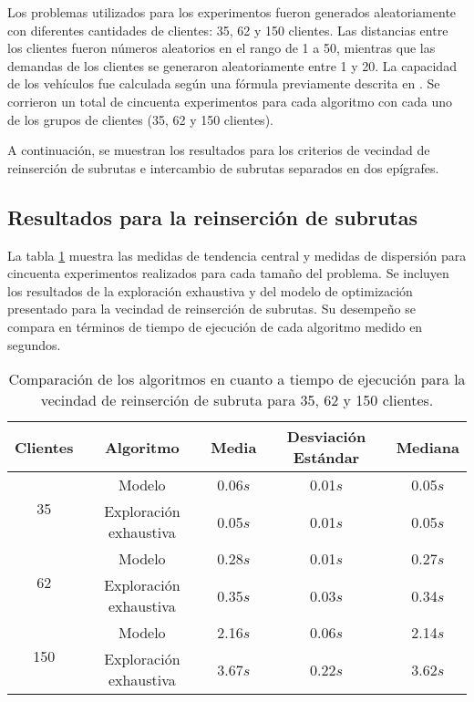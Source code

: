 \documentclass[12pt]{report}
\begin{document}
Los problemas utilizados para los experimentos fueron generados aleatoriamente con diferentes cantidades de clientes: 35, 62 y 150 clientes. Las distancias entre los clientes fueron números aleatorios en el rango de 1 a 50, mientras que las demandas de los clientes se generaron aleatoriamente entre 1 y 20. La capacidad de los vehículos fue calculada según una fórmula previamente descrita en \cite{ref12}. Se corrieron un total de cincuenta experimentos para cada algoritmo con cada uno de los grupos de clientes (35, 62 y 150 clientes).

A continuación, se muestran los resultados para los criterios de vecindad de reinserción de subrutas e intercambio de subrutas separados en dos epígrafes.
\subsection{Resultados para la reinserción de subrutas}
\label{sec:Resultados para la reinsercion de subrutas}

La tabla \ref{tab:reinsercion_subruta} muestra las medidas de tendencia central y medidas de dispersión para cincuenta experimentos realizados para cada tamaño del problema. Se incluyen los resultados de la exploración exhaustiva y del modelo de optimización presentado para la vecindad de reinserción de subrutas. Su desempeño se compara en términos de tiempo de ejecución de cada algoritmo medido en segundos.

\begin{table}[h]
	\centering
	\begin{tabular}{|c|c|c|c|c|}
		\hline
		\textbf{Clientes} & \textbf{Algoritmo} & \textbf{Media} & \textbf{Desviación Estándar} & \textbf{Mediana} \\
		\hline
		\multirow{2}{*}{35} & Modelo & 0.06$s$ & 0.01$s$ & 0.05$s$ \\
							& Exploración exhaustiva& 0.05$s$ & 0.01$s$ & 0.05$s$ \\
		\hline
		\multirow{2}{*}{62} & Modelo & 0.28$s$ & 0.01$s$ & 0.27$s$ \\
							& Exploración exhaustiva & 0.35$s$ & 0.03$s$ & 0.34$s$ \\
		\hline
		\multirow{2}{*}{150} & Modelo & 2.16$s$ & 0.06$s$ & 2.14$s$ \\
							& Exploración exhaustiva & 3.67$s$ & 0.22$s$ & 3.62$s$ \\
		\hline
	\end{tabular}
	\caption{Comparación de los algoritmos en cuanto a tiempo de ejecución para la vecindad de reinserción de subruta para 35, 62 y 150 clientes.}
	\label{tab:reinsercion_subruta}
\end{table}
\end{document}
